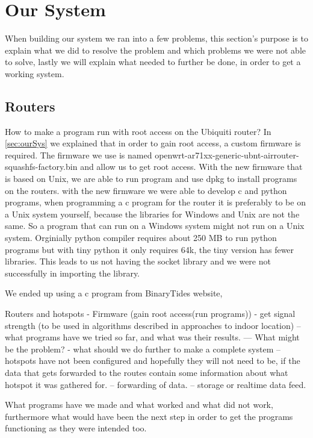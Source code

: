 \section{Our System}
When building our system we ran into a few problems, this section's purpose is to explain what we did to resolve the problem and which problems we were not able to solve, lastly we will explain what needed to further be done, in order to get a working system.

\subsection*{Routers}
How to make a program run with root access on the Ubiquiti router? In \cref{sec:ourSys} we explained that in order to gain root access, a custom firmware is required. The firmware we use is named openwrt-ar71xx-generic-ubnt-airrouter-squashfs-factory.bin and allow us to get root access. With the new firmware that is based on Unix, we are able to run program and use dpkg to install programs on the routers. with the new firmware we were able to develop c and python programs, when programming a c program for the router it is preferably to be on a Unix system yourself, because the libraries for Windows and Unix are not the same. So a program that can run on a Windows system might not run on a Unix system. Orginially python compiler requires about 250 MB to run python programs but with tiny python it only requires 64k, the tiny version has fewer libraries. This leads to us not having the socket library and we were not successfully in importing the library.

We ended up using a c program from BinaryTides website\cite{SnifferCode},


Routers and hotspots
- Firmware (gain root access(run programs))
- get signal strength (to be used in algorithms described in approaches to indoor location)
-- what programs have we tried so far, and what was their results.
--- What might be the problem?
- what should we do further to make a complete system
-- hotspots have not been configured and hopefully they will not need to be, if the data that gets forwarded to the routes contain some information about what hotspot it was gathered for.
-- forwarding of data.
-- storage or realtime data feed.


What programs have we made and what worked and what did not work, furthermore what would have been the next step in order to get the programs functioning as they were intended too.

